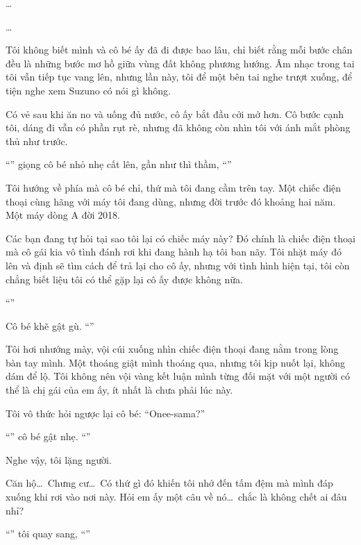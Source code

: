 \documentclass[../main.tex]{subfiles}
\begin{document}
\ct

\dots

\dots

Tôi không biết mình và cô bé ấy đã đi được bao lâu, chỉ biết rằng mỗi bước chân đều là những bước mơ hồ giữa vùng đất không phương hướng. Âm nhạc trong tai tôi vẫn tiếp tục vang lên, nhưng lần này, tôi để một bên tai nghe trượt xuống, để tiện nghe xem Suzuno có nói gì không.

Có vẻ sau khi ăn no và uống đủ nước, cô ấy bắt đầu cởi mở hơn. Cô bước cạnh tôi, dáng đi vẫn có phần rụt rè, nhưng đã không còn nhìn tôi với ánh mắt phòng thủ như trước.

``'' giọng cô bé nhỏ nhẹ cất lên, gần như thì thầm, ``''

Tôi hướng về phía mà cô bé chỉ, thứ mà tôi đang cầm trên tay. Một chiếc điện thoại cùng hãng với máy tôi đang dùng, nhưng đời trước đó khoảng hai năm. Một máy dòng A đời 2018.

Các bạn đang tự hỏi tại sao tôi lại có chiếc máy này? Đó chính là chiếc điện thoại mà cô gái kia vô tình đánh rơi khi đang hành hạ tôi ban nãy. Tôi nhặt máy đó lên và định sẽ tìm cách để trả lại cho cô ấy, nhưng với tình hình hiện tại, tôi còn chẳng biết liệu tôi có thể gặp lại cô ấy được không nữa.

``''

Cô bé khẽ gật gù. ``''

Tôi hơi nhướng mày, vội cúi xuống nhìn chiếc điện thoại đang nằm trong lòng bàn tay mình. Một thoáng giật mình thoáng qua, nhưng tôi kịp nuốt lại, không dám để lộ. Tôi không nên vội vàng kết luận mình từng đối mặt với một người có thể là chị gái của em ấy, ít nhất là chưa phải lúc này.

Tôi vô thức hỏi ngược lại cô bé: ``Onee-sama?''

``'' cô bé gật nhẹ. ``''

Nghe vậy, tôi lặng người.

Căn hộ\dots\ Chưng cư\dots\ Có thứ gì đó khiến tôi nhớ đến tấm đệm mà mình đáp xuống khi rơi vào nơi này. Hỏi em ấy một câu về nó\dots\ chắc là không chết ai đâu nhỉ?

``'' tôi quay sang, ``''
\end{document}
